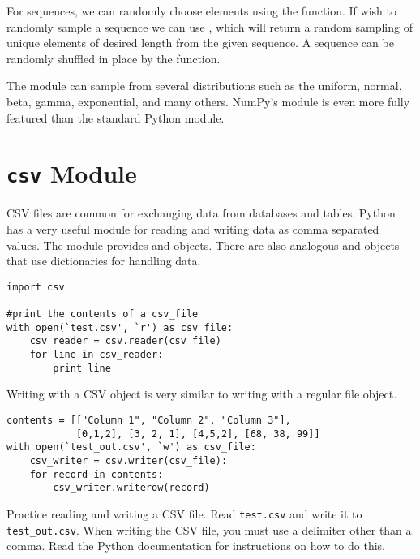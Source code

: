 For sequences, we can randomly choose elements using the  function.
If wish to randomly sample a sequence we can use , which will return a random sampling of unique elements of desired length from the given sequence.
A sequence can be randomly shuffled in place by the  function.

The  module can sample from several distributions such as the uniform, normal, beta, gamma, exponential, and many others.
NumPy's  module is even more fully featured than the standard Python  module.

\section*{\texttt{csv} Module}
CSV files are common for exchanging data from databases and tables. 
Python has a very useful module for reading and writing data as comma separated values.
The  module provides  and  objects.
There are also analogous  and  objects that use dictionaries for handling data.
\begin{lstlisting}
import csv

#print the contents of a csv_file
with open(`test.csv', `r') as csv_file:
    csv_reader = csv.reader(csv_file)
    for line in csv_reader:
        print line
\end{lstlisting}

Writing with a CSV  object is very similar to writing with a regular file object.
\begin{lstlisting}
contents = [["Column 1", "Column 2", "Column 3"],
            [0,1,2], [3, 2, 1], [4,5,2], [68, 38, 99]]
with open(`test_out.csv', `w') as csv_file:
    csv_writer = csv.writer(csv_file):
    for record in contents:
        csv_writer.writerow(record)
\end{lstlisting}

\begin{problem}
Practice reading and writing a CSV file.
Read \texttt{test.csv} and write it to \texttt{test\_out.csv}.
When writing the CSV file, you must use a delimiter other than a comma.
Read the Python documentation for instructions on how to do this.
\end{problem}

